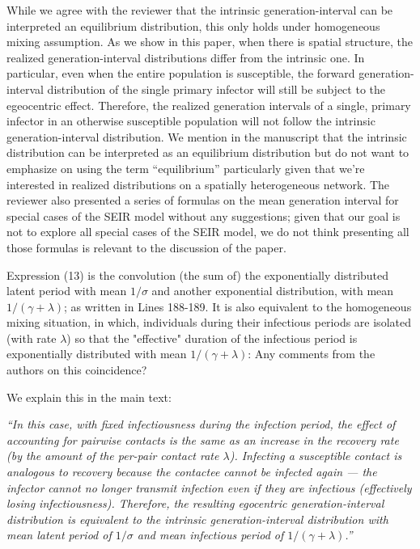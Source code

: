 \documentclass[12pt]{article}
\newcommand{\revtext}{\textsf}
\newcommand{\newtext}[1]{\textsl{``#1''}}
\begin{document}
While we agree with the reviewer that the intrinsic generation-interval can be interpreted an equilibrium distribution, this only holds under homogeneous mixing assumption. 
As we show in this paper, when there is spatial structure, the realized generation-interval distributions differ from the intrinsic one. 
In particular, even when the entire population is susceptible, the forward generation-interval distribution of the single primary infector will still be subject to the egeocentric effect.
Therefore, the realized generation intervals of a single, primary infector in an otherwise susceptible population will not follow the intrinsic generation-interval distribution. We mention in the manuscript that the intrinsic distribution can be interpreted as an equilibrium distribution but do not want to emphasize on using the term ``equilibrium'' particularly given that we're interested in realized distributions on a spatially heterogeneous network.
The reviewer also presented a series of formulas on the mean generation interval for special cases of the SEIR model without any suggestions;
given that our goal is not to explore all special cases of the SEIR model, we do not think presenting all those formulas is relevant to the discussion of the paper.

\revtext{
Expression (13) is the convolution (the sum of) the exponentially
distributed latent period with mean $1/\sigma$ and another exponential distribution, with mean $1/(\gamma+\lambda)$; as written in Lines 188-189. It is also equivalent
to the homogeneous mixing situation, in which, individuals during their
infectious periods are isolated (with rate $\lambda$) so that the "effective" duration
of the infectious period is exponentially distributed with mean $1/(\gamma + \lambda)$:
Any comments from the authors on this coincidence?
}

We explain this in the main text:

\newtext{In this case, with fixed infectiousness during the infection period, the effect of accounting for pairwise contacts is the same as an increase in the recovery rate (by the amount of the per-pair contact rate $\lambda$). 
Infecting a susceptible contact is analogous to recovery because the contactee cannot be infected again --- the infector cannot no longer transmit infection even if they are infectious (effectively losing infectiousness).
Therefore, the resulting egocentric generation-interval distribution is equivalent to the intrinsic generation-interval distribution with mean latent period of $1/\sigma$ and mean infectious period of $1/(\gamma + \lambda)$.}
\end{document}
